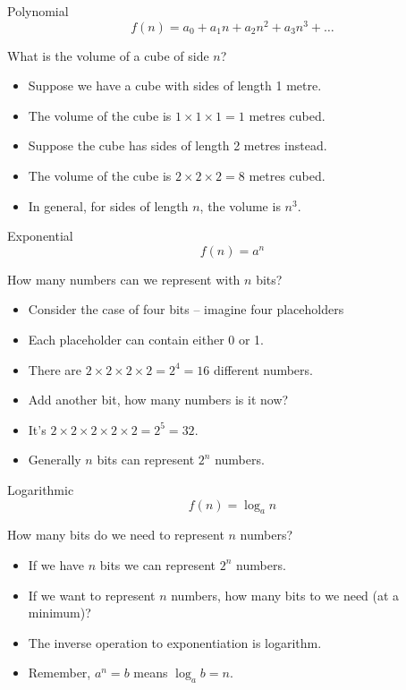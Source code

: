 \begin{frame}{Polynomial}
  \[ f(n) = a_0 + a_1 n + a_2 n^2 + a_3 n^3 + \ldots \]
  \begin{alertblock}{What is the volume of a cube of side $n$?}
    \begin{itemize}
      \item Suppose we have a cube with sides of length 1 metre.
      \item The volume of the cube is $1 \times 1 \times 1 = 1$ metres cubed.
      \item Suppose the cube has sides of length 2 metres instead.
      \item The volume of the cube is $2 \times 2 \times 2 = 8$ metres cubed.
      \item In general, for sides of length $n$, the volume is $n^3$.
    \end{itemize}
  \end{alertblock}
\end{frame}


\begin{frame}{Exponential}
  \[ f(n) = a^n \]
  \begin{alertblock}{How many numbers can we represent with $n$ bits?}
    \begin{itemize}
      \item Consider the case of four bits -- imagine four placeholders \textbf{}\textbf{}\textbf{}\textbf{}
      \item Each placeholder can contain either 0 or 1.
      \item There are $2 \times 2 \times 2 \times 2 = 2^4 = 16$ different numbers.
      \item Add another bit, how many numbers is it now?
      \item It's $2 \times 2 \times 2 \times 2 \times 2 = 2^5 = 32$.
      \item Generally $n$ bits can represent $2^n$ numbers.
    \end{itemize}
  \end{alertblock}
\end{frame}


\begin{frame}{Logarithmic}
  \[ f(n) = \log_a n \]
  \begin{alertblock}{How many bits do we need to represent $n$ numbers?}
    \begin{itemize}
      \item If we have $n$ bits we can represent $2^n$ numbers.
      \item If we want to represent $n$ numbers, how many bits to we need (at a minimum)?
      \item The inverse operation to exponentiation is logarithm.
      \item Remember, $a^n = b$ means $\log_a b = n$.
    \end{itemize}
  \end{alertblock}
\end{frame}

